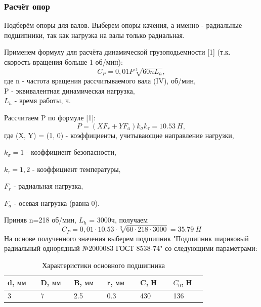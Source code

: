 \documentclass[14pt,a4paper,russian]{scrartcl}
\begin{document}
    \subsubsection{Расчёт опор}
        Подберём опоры для валов. Выберем опоры качения, а именно - радиальные подшипники,
        так как нагрузка на валы только радиальная.\par
        Применем формулу для расчёта динамической грузоподьемности [1] (т.к. скорость вращения
        больше 1 об/мин):
        \[ C_P = 0,01P\sqrt[3]{60nL_h}, \]
        где n - частота вращения рассчитываемого вала (IV), об/мин, \\P - эквивалентная
        динамическая нагрузка,\\ \( L_h \) - время работы, ч.\par
        Рассчитаем P по формуле [1]:
        \[ P = (XF_r + YF_a)k_\sigma k_\tau = 10.53\ H, \]
        где (X, Y) = (1, 0) - коэффициенты, учитывающие направление нагрузки,\par
            \( k_\sigma = 1 \) - коэффициент безопасности,\par
            \( k_\tau=1,2 \) - коэффициент температуры,\par
            \( F_r \) - радиальная нагрузка, \par
            \( F_a \) - осевая нагрузка (равна 0).\par
        Приняв n=218 об/мин, \( L_h \) = 3000ч, получаем
        \[ C_P = 0,01\cdot 10.53 \cdot \sqrt[3]{60\cdot 218\cdot 3000} = 35.79\ H \]
        \cite{Dorf}
        На основе полученного значения выберем подшипник "Подшипник шариковый радиальный однорядный №2000083 ГОСТ 8538-74" со следующими
        параметрами:
        \begin{table}[h!]
            \begin{center}
                \begin{tabular}{p{0.13\linewidth}p{0.13\linewidth}p{0.13\linewidth}p{0.13\linewidth}p{0.13\linewidth}p{0.13\linewidth}}
                    \hline
                    d, \( \text{мм} \) & D, \( \text{мм} \) & B, \( \text{мм} \) & r, \( \text{мм} \) & C, Н & \( C_0 \), Н \\
                    \hline
                    3 & 7 & 2.5 & 0.3 & 430 & 136 \\
                    \hline
                \end{tabular}
                \caption{{Характеристики основного подшипника}}\label{tab:podsh}
            \end{center}
        \end{table}
\end{document}
